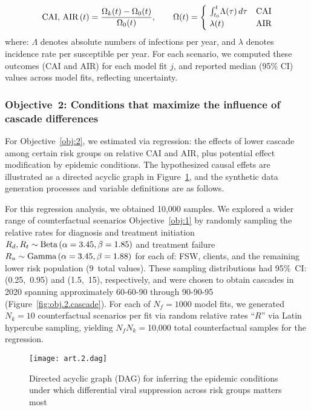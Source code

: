 \begin{equation}
  \textnormal{CAI, AIR}\,(t) = \frac{\Omega_{k}(t) - \Omega_{0}(t)}{\Omega_{0}(t)}
  ,\qquad \Omega(t) =
  \begin{cases}
    ~\int_{t_0}^{t}\!\Lambda(\tau)\,d\tau & \textnormal{CAI} \\
    ~\lambda(t) & \textnormal{AIR}
  \end{cases}
\end{equation} where:
$\Lambda$ denotes absolute numbers of infections per year, and
$\lambda$ denotes incidence rate per susceptible per year.
For each scenario, we computed these outcomes (CAI and AIR) for each model fit $j$,
and reported median (95\% CI) values across model fits, reflecting uncertainty.
\subsubsection{Objective~2: Conditions that maximize the influence of cascade differences}\label{meth.obj.2}
For Objective~\ref{obj:2}, we estimated via regression:
the effects of lower cascade among certain risk groups on relative CAI and AIR,
plus potential effect modification by epidemic conditions.
The hypothesized causal effets are illustrated
as a directed acyclic graph in Figure~\ref{fig:obj.2.dag},
and the synthetic data generation processes and variable definitions are as follows.
\par
For this regression analysis, we obtained 10,000 samples.
We explored a wider range of counterfactual scenarios \vs Objective~\ref{obj:1}
by randomly sampling the relative rates for
diagnosis and treatment initiation $R_d, R_t \sim \textnormal{Beta}\,(\alpha=3.45,\beta=1.85)$
and treatment failure $R_u \sim \textnormal{Gamma}\,(\alpha=3.45,\beta=1.88)$
for each of: FSW, clients, and the remaining lower risk population (9~total values).
These sampling distributions had 95\%~CI: (0.25,~0.95) and (1.5,~15), respectively,
and were chosen to obtain cascades in 2020 spanning
approximately \mbox{60-60-90} through \mbox{90-90-95} (Figure~\ref{fig:obj.2.cascade}). %
For each of $N_f = 1000$ model fits, we generated $N_k = 10$ counterfactual scenarios per fit
via random relative rates ``$R$'' via Latin hypercube sampling,
yielding $N_f N_k = {}$10,000 total counterfactual samples for the regression.
\begin{figure}
  \centering\texttt{[image: art.2.dag]}
  \caption{Directed acyclic graph (DAG) for inferring
    the epidemic conditions under which
    differential viral suppression across risk groups matters most}
  \label{fig:obj.2.dag}
\end{figure}
